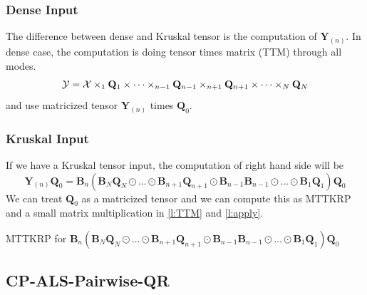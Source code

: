 \documentclass{article}
\newcommand{\mat}[1]{\mathbf{#1}}
\newcommand{\T}[2][]{#1{\mathbf{\cal{#2}}}} 						%
\begin{document}
\subsubsection{Dense Input}
The difference between dense and Kruskal tensor is the computation of $\mat{Y}_{(n)}$. In dense case, the computation is doing tensor times matrix (TTM) through all modes.
$$\T[]{Y} = \T[]{X} \times_1 \mat{Q}_1 \times \dots \times_{n-1} \mat{Q}_{n-1} \times_{n+1}\mat{Q}_{n+1} \times \dots \times_N \mat{Q}_N$$
and use matricized tensor $\mat{Y}_{(n)}$ times $\mat{Q}_0$.

\subsubsection{Kruskal Input}
If we have a Kruskal tensor input, the computation of right hand side will be 
\begin{equation}
  \mat{Y}_{(n)}\mat{Q}_0  = \mat{B}_n(\mat{B}_N\mat{Q}_N \odot \dots \odot \mat{B}_{n+1}\mat{Q}_{n+1} \odot \mat{B}_{n-1}\mat{B}_{n-1} \odot  \dots \odot \mat{B}_1\mat{Q}_1)\mat{Q}_0 \nonumber 
\end{equation}
We can treat $\mat{Q}_0$ as a matricized tensor and we can compute this as MTTKRP and a small matrix multiplication in \cref{l:TTM} and \cref{l:apply}.
\begin{algorithm}[!ht]
  \begin{algorithmic}
    \State MTTKRP for $\mat{B}_n(\mat{B}_N\mat{Q}_N \odot \dots \odot \mat{B}_{n+1}\mat{Q}_{n+1} \odot \mat{B}_{n-1}\mat{B}_{n-1} \odot  \dots \odot \mat{B}_1\mat{Q}_1)\mat{Q}_0 $
  \end{algorithmic}
\end{algorithm}



\subsection{CP-ALS-Pairwise-QR}
\end{document}
